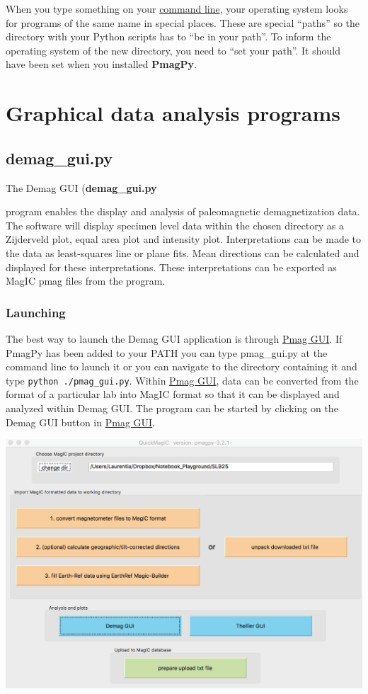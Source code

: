 \documentclass[11pt]{book}
\begin{document}
{When you type something on your \href{#command_line}{command line}, your operating system looks for programs of the same name in special places.  These are special ``paths'' so the directory with your Python scripts has to ``be in your path''.  To inform the operating system of the new directory, you need to ``set your path''.    It should have been set when you installed {\bf PmagPy}.



\section{Graphical data analysis programs}
\subsection{demag\_gui.py}

The  Demag GUI (\bf demag\_gui.py}  program enables the display and analysis of paleomagnetic demagnetization data. The software will display specimen level data within the chosen directory as a Zijderveld plot, equal area plot and intensity plot. Interpretations can be made to the data as least-squares line or plane fits. Mean directions can be calculated and displayed for these interpretations. These interpretations can be exported as MagIC pmag files from the program.

\subsubsection{Launching}\label{launching}

The best way to launch the Demag GUI application is through  \href{#pmag_gui.py}{Pmag GUI}. If PmagPy has been added to your PATH you can type pmag\_gui.py at the command line to launch it or you can navigate to the directory containing it and type \texttt{python  ./pmag_gui.py}. Within \href{#pmag_gui.py}{Pmag GUI}, data can be converted from the format of a particular lab into MagIC format so that it can be displayed and analyzed within Demag GUI. The program can be started by clicking on the Demag GUI button in \href{#pmag_gui.py}{Pmag GUI}.

\includegraphics[width=10 cm]{EPSfiles/demag_gui_QuickMagicLauncher.eps}
\end{document}

